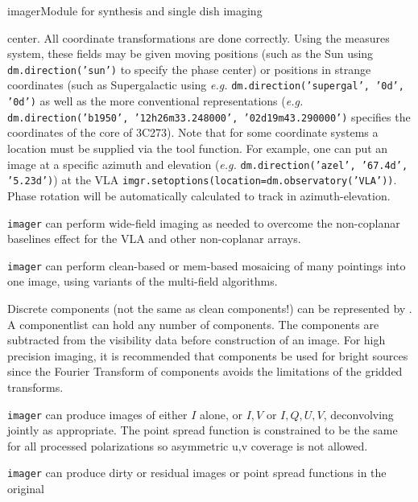 \begin{ahmodule}{imager}{Module for synthesis and single dish imaging}
\begin{description}
center. All coordinate transformations are done correctly.  Using the
measures system, these fields may be given moving positions (such as
the Sun using {\tt dm.direction('sun')} to specify the phase center) or
positions in strange coordinates (such as Supergalactic using
{\em e.g.} {\tt dm.direction('supergal', '0d', '0d')} as well as
the more conventional representations ({\em e.g.}
{\tt dm.direction('b1950', '12h26m33.248000', '02d19m43.290000')} specifies
the coordinates of the core of 3C273). Note that for
some coordinate systems a location must be supplied via
the  tool function. For example,
one can put an image at a specific azimuth and elevation ({\em e.g.}
{\tt dm.direction('azel', '67.4d', '5.23d')}) at the
VLA {\tt imgr.setoptions(location=dm.observatory('VLA'))}. Phase 
rotation will be automatically calculated to track in 
azimuth-elevation.
\item[Wide-field imaging] {\tt imager} can perform wide-field
imaging as needed to overcome the non-coplanar baselines
effect for the VLA and other non-coplanar arrays.
\item[Mosaicing] {\tt imager} can perform clean-based or mem-based mosaicing
of many pointings into one image, using variants of the multi-field
algorithms.
\item[Processing of component lists] Discrete components
(not the same as clean components!) can be represented by 
. A componentlist
can hold any number of components. The components are subtracted from
the visibility data before construction of an image. For high
precision imaging, it is recommended that components be used for
bright sources since the Fourier Transform of components avoids the
limitations of the gridded transforms.
\item[Joint deconvolution of Stokes IQUV] {\tt imager} can produce
images of either $I$ alone, or $I,V$ or $I,Q,U,V$, deconvolving
jointly as appropriate. The point spread function is constrained to
be the same for all processed polarizations so asymmetric u,v coverage is
not allowed.
\item[Production of complex images] {\tt imager} can produce
dirty or residual images or point spread functions in the original 

\end{description}
\end{ahmodule}

